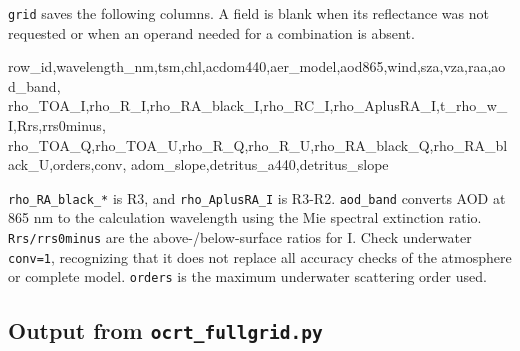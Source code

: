 \texttt{grid} saves the following columns. A field is blank when its reflectance was not requested or when an operand needed for a combination is absent.


\begin{ManualCode}
row_id,wavelength_nm,tsm,chl,acdom440,aer_model,aod865,wind,sza,vza,raa,aod_band,
rho_TOA_I,rho_R_I,rho_RA_black_I,rho_RC_I,rho_AplusRA_I,t_rho_w_I,Rrs,rrs0minus,
rho_TOA_Q,rho_TOA_U,rho_R_Q,rho_R_U,rho_RA_black_Q,rho_RA_black_U,orders,conv,
adom_slope,detritus_a440,detritus_slope
\end{ManualCode}

\texttt{rho\_\allowbreak{}RA\_\allowbreak{}black\_\allowbreak{}*} is R3, and \texttt{rho\_\allowbreak{}AplusRA\_\allowbreak{}I} is R3-R2. \texttt{aod\_\allowbreak{}band} converts AOD at 865 nm to the calculation wavelength using the Mie spectral extinction ratio. \texttt{Rrs/\allowbreak{}rrs0minus} are the above-/below-surface ratios for I. Check underwater \texttt{conv=\allowbreak{}1}, recognizing that it does not replace all accuracy checks of the atmosphere or complete model. \texttt{orders} is the maximum underwater scattering order used.

\subsection{Output from \texttt{ocrt\_\allowbreak{}fullgrid.\allowbreak{}py}}
\label{sec:auto:06_python_batch:8.3}

